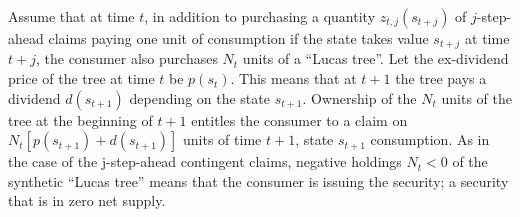   Assume that at time $t$,  in addition to purchasing
a quantity $z_{t,j}(s_{t+j})$   of $j$-step-ahead claims paying
one unit of consumption  if the state takes value
$s_{t+j}$ at time $t+j$, the consumer also purchases  $N_{t}$
units of  a  ``Lucas tree''. Let the ex-dividend price of the
tree at time $t$  %
 be $p(s_t)$.  This means that at $t+1$  the
tree pays a dividend $d(s_{t+1})$ depending on the
 state $s_{t+1}$. Ownership of the $N_{t}$ units
of the tree  at the beginning of $t+1$ entitles the
consumer to a claim on  $N_{t}[p(s_{t+1}) + d(s_{t+1})]$
 units of time $t+1$, state $s_{t+1}$ consumption.
As in the case of the j-step-ahead contingent claims, 
negative holdings $N_{t}<0$ of the synthetic ``Lucas tree''
means that the consumer is issuing the security; a security that
is in zero net supply.


